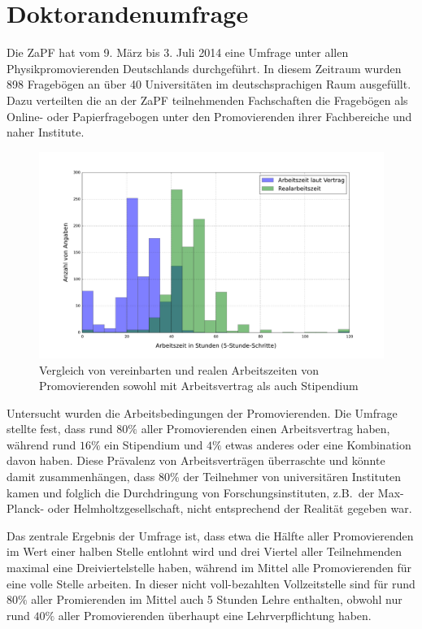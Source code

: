 \documentclass{scrartcl}
\begin{document}
\section*{Doktorandenumfrage}
Die ZaPF hat vom 9. März bis 3. Juli 2014 eine Umfrage unter allen Physikpromovierenden Deutschlands durchgeführt. In diesem Zeitraum wurden 898 Fragebögen an über 40 Universitäten im deutschsprachigen Raum ausgefüllt. Dazu verteilten die an der ZaPF teilnehmenden Fachschaften die Fragebögen als Online- oder Papierfragebogen unter den Promovierenden ihrer Fachbereiche und naher Institute.

\begin{figure}
	\includegraphics[width=\textwidth]{all_hours.pdf}
	\caption{Vergleich von vereinbarten und realen Arbeitszeiten von Promovierenden sowohl mit Arbeitsvertrag als auch Stipendium}
\end{figure}

Untersucht wurden die Arbeitsbedingungen der Promovierenden. Die Umfrage stellte fest, dass rund \(80\%\) aller Promovierenden einen Arbeitsvertrag haben, während rund \(16\%\) ein Stipendium und \(4\%\) etwas anderes oder eine Kombination davon haben. Diese Prävalenz von Arbeitsverträgen überraschte und könnte damit zusammenhängen, dass 80\% der Teilnehmer von universitären Instituten kamen und folglich die Durchdringung von Forschungsinstituten, z.B.\ der Max-Planck- oder Helmholtzgesellschaft, nicht entsprechend der Realität gegeben war.

Das zentrale Ergebnis der Umfrage ist, dass etwa die Hälfte aller Promovierenden im Wert einer halben Stelle entlohnt wird und drei Viertel aller Teilnehmenden maximal eine Dreiviertelstelle haben, während im Mittel alle Promovierenden für eine volle Stelle arbeiten.
In dieser nicht voll-bezahlten Vollzeitstelle sind für rund \(80\%\) aller Promierenden im Mittel auch 5 Stunden Lehre enthalten, obwohl nur rund \(40\%\) aller Promovierenden überhaupt eine Lehrverpflichtung haben.
\end{document}
